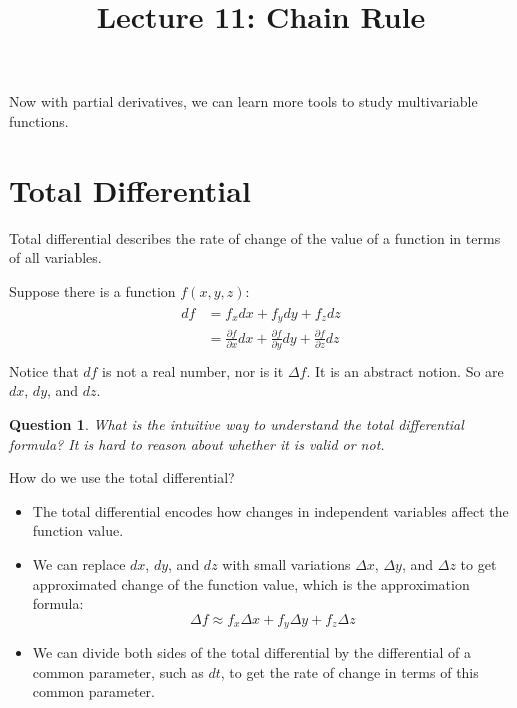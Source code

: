 \documentclass{article}
\title{Lecture 11: Chain Rule}
\author{}
\date{}
\newtheorem{question}{Question}
\begin{document}
    
\maketitle

Now with partial derivatives, we can learn more tools to study multivariable 
functions.

\section{Total Differential}

Total differential describes the rate of change of the value of a function in 
terms of all variables.

Suppose there is a function $f(x, y, z)$:
\begin{gather*}
  \begin{split}
    df &= f_xdx + f_ydy + f_zdz \\
       &= \frac{\partial f}{\partial x}dx + \frac{\partial f}{\partial y}dy + \frac{\partial f}{\partial z}dz \\
  \end{split}
\end{gather*}
Notice that $df$ is not a real number, nor is it $\Delta f$. It is an abstract 
notion. So are $dx$, $dy$, and $dz$.

\begin{question}
  What is the intuitive way to understand the total differential formula? It is 
  hard to reason about whether it is valid or not.
\end{question}

How do we use the total differential?
\begin{itemize}
  \item The total differential encodes how changes in independent variables 
    affect the function value.
  \item We can replace $dx$, $dy$, and $dz$ with small variations $\Delta x$, 
    $\Delta y$, and $\Delta z$ to get approximated change of the function value, 
    which is the approximation formula:
    \begin{equation*}
      \Delta f \approx f_x \Delta x + f_y \Delta y + f_z \Delta z
    \end{equation*}
  \item We can divide both sides of the total differential by the differential 
    of a common parameter, such as $dt$, to get the rate of change in terms of 
    this common parameter.
\end{itemize}
\end{document}

